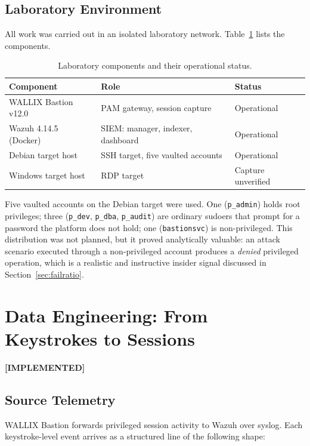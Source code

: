 \documentclass{classeENS}
\providecommand{\statusdone}{\textbf{[IMPLEMENTED]}}
\begin{document}
\subsection{Laboratory Environment}
All work was carried out in an isolated laboratory network. Table~\ref{tab:lab} lists the components.

\begin{table}[H]
\centering
\begin{tabular}{|l|l|l|}
\hline
\textbf{Component} & \textbf{Role} & \textbf{Status} \\
\hline
WALLIX Bastion v12.0 & PAM gateway, session capture & Operational \\
Wazuh 4.14.5 (Docker) & SIEM: manager, indexer, dashboard & Operational \\
Debian target host & SSH target, five vaulted accounts & Operational \\
Windows target host & RDP target & Capture unverified \\
\hline
\end{tabular}
\caption{Laboratory components and their operational status.}
\label{tab:lab}
\end{table}

Five vaulted accounts on the Debian target were used. One (\texttt{p\_admin}) holds root privileges; three (\texttt{p\_dev}, \texttt{p\_dba}, \texttt{p\_audit}) are ordinary sudoers that prompt for a password the platform does not hold; one (\texttt{bastionsvc}) is non-privileged. This distribution was not planned, but it proved analytically valuable: an attack scenario executed through a non-privileged account produces a \emph{denied} privileged operation, which is a realistic and instructive insider signal discussed in Section~\ref{sec:failratio}.

\section{Data Engineering: From Keystrokes to Sessions}
\label{sec:dataeng}
\statusdone

\subsection{Source Telemetry}
WALLIX Bastion forwards privileged session activity to Wazuh over syslog. Each keystroke-level event arrives as a structured line of the following shape:
\end{document}
